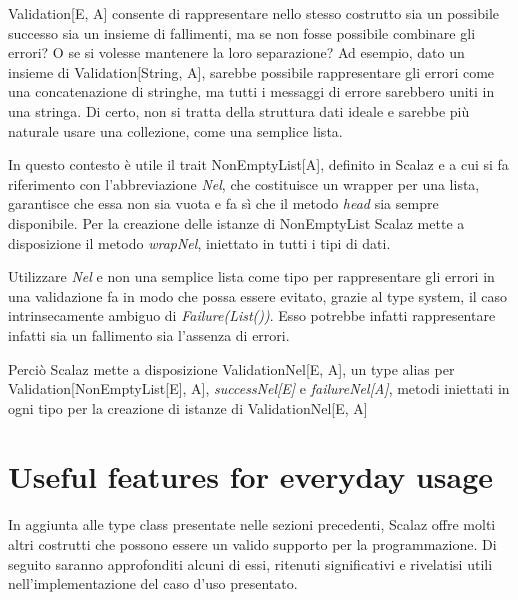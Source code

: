 Validation[E, A] consente di rappresentare nello stesso costrutto sia un possibile successo sia un insieme di fallimenti, ma se non fosse possibile combinare gli errori? O se si volesse mantenere la loro separazione? Ad esempio, dato un insieme di Validation[String, A], sarebbe possibile rappresentare gli errori come una concatenazione di stringhe, ma tutti i messaggi di errore sarebbero uniti in una stringa. Di certo, non si tratta della struttura dati ideale e sarebbe più naturale usare una collezione, come una semplice lista.

In questo contesto è utile il trait NonEmptyList[A], definito in Scalaz e a cui si fa riferimento con l'abbreviazione \textit{Nel}, che costituisce un wrapper per una lista, garantisce che essa non sia vuota e fa sì che il metodo \textit{head} sia sempre disponibile. Per la creazione delle istanze di NonEmptyList Scalaz mette a disposizione il metodo \textit{wrapNel}, iniettato in tutti i tipi di dati.



Utilizzare \textit{Nel} e non una semplice lista come tipo per rappresentare gli errori in una validazione fa in modo che possa essere evitato, grazie al type system, il caso intrinsecamente ambiguo di \textit{Failure(List())}. Esso potrebbe infatti rappresentare infatti sia un fallimento sia l'assenza di errori.

Perciò Scalaz mette a disposizione ValidationNel[E, A], un type alias per Validation[NonEmptyList[E], A], \textit{successNel[E]} e \textit{failureNel[A]}, metodi iniettati in ogni tipo per la creazione di istanze di ValidationNel[E, A]




\section{Useful features for everyday usage}

In aggiunta alle type class presentate nelle sezioni precedenti, Scalaz offre molti altri costrutti che possono essere un valido supporto per la programmazione. Di seguito saranno approfonditi alcuni di essi, ritenuti significativi e rivelatisi utili nell'implementazione del caso d'uso presentato.

